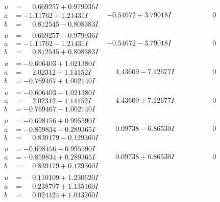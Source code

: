 \documentclass[1p]{elsarticle_modified}
\theoremstyle{definition}
\begin{document}
$$\begin{array}{c|c|c}
\begin{aligned}
u &= \phantom{-}0.669257 + 0.979936 I \\
a &= -1.11762 + 1.21431 I \\
b &= \phantom{-}0.812545 - 0.808383 I\end{aligned}
 & -0.54672 + 3.79018 I & \phantom{-0.000000 } 0 \\ \hline\begin{aligned}
u &= \phantom{-}0.669257 - 0.979936 I \\
a &= -1.11762 - 1.21431 I \\
b &= \phantom{-}0.812545 + 0.808383 I\end{aligned}
 & -0.54672 - 3.79018 I & \phantom{-0.000000 } 0 \\ \hline\begin{aligned}
u &= -0.606403 + 1.021380 I \\
a &= \phantom{-}2.02312 + 1.14152 I \\
b &= -0.769467 + 1.002140 I\end{aligned}
 & \phantom{-}4.43609 - 7.12677 I & \phantom{-0.000000 } 0 \\ \hline\begin{aligned}
u &= -0.606403 - 1.021380 I \\
a &= \phantom{-}2.02312 - 1.14152 I \\
b &= -0.769467 - 1.002140 I\end{aligned}
 & \phantom{-}4.43609 + 7.12677 I & \phantom{-0.000000 } 0 \\ \hline\begin{aligned}
u &= -0.698456 + 0.995590 I \\
a &= -0.859834 - 0.289365 I \\
b &= \phantom{-}0.839179 - 0.129360 I\end{aligned}
 & \phantom{-}0.09738 - 6.86530 I & \phantom{-0.000000 } 0 \\ \hline\begin{aligned}
u &= -0.698456 - 0.995590 I \\
a &= -0.859834 + 0.289365 I \\
b &= \phantom{-}0.839179 + 0.129360 I\end{aligned}
 & \phantom{-}0.09738 + 6.86530 I & \phantom{-0.000000 } 0 \\ \hline\begin{aligned}
u &= \phantom{-}0.110109 + 1.230620 I \\
a &= \phantom{-}0.238797 + 1.135160 I \\
b &= \phantom{-}0.024424 + 1.043260 I\end{aligned}

\end{array}$$
\end{document}
